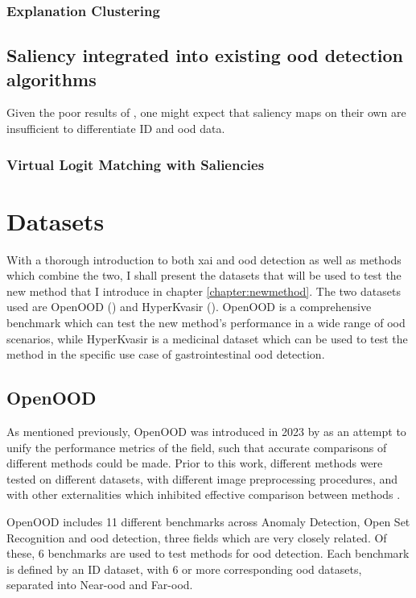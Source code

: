 \documentclass[UKenglish]{uiomasterthesis} %
\theoremstyle{definition}
\begin{document}
\subsubsection{Explanation Clustering}


\subsection{Saliency integrated into existing \ac{ood} detection algorithms}

Given the poor results of \cite{martinez}, one might expect that saliency maps on their own are insufficient to differentiate ID and \ac{ood} data.

\subsubsection{Virtual Logit Matching with Saliencies}


\section{Datasets} \label{section:datasets}

With a thorough introduction to both \ac{xai} and \ac{ood} detection as well as methods which combine the two, I shall present the datasets that will be used to test the new method that I introduce in chapter \ref{chapter:newmethod}. The two datasets used are OpenOOD (\cite{openood}) and HyperKvasir (\cite{hyperkvasir}). OpenOOD is a comprehensive benchmark which can test the new method's performance in a wide range of \ac{ood} scenarios, while HyperKvasir is a medicinal dataset which can be used to test the method in the specific use case of gastrointestinal \ac{ood} detection.


\subsection{OpenOOD} \label{chapter:openood}

As mentioned previously, OpenOOD was introduced in 2023 by \cite{openood} as an attempt to unify the performance metrics of the field, such that accurate comparisons of different methods could be made. Prior to this work, different methods were tested on different datasets, with different image preprocessing procedures, and with other externalities which inhibited effective comparison between methods \cite{openood}.

OpenOOD includes 11 different benchmarks across Anomaly Detection, Open Set Recognition and \ac{ood} detection, three fields which are very closely related. Of these, 6 benchmarks are used to test methods for \ac{ood} detection. Each benchmark is defined by an ID dataset, with 6 or more corresponding \ac{ood} datasets, separated into Near-\ac{ood} and Far-\ac{ood}.
\end{document}
